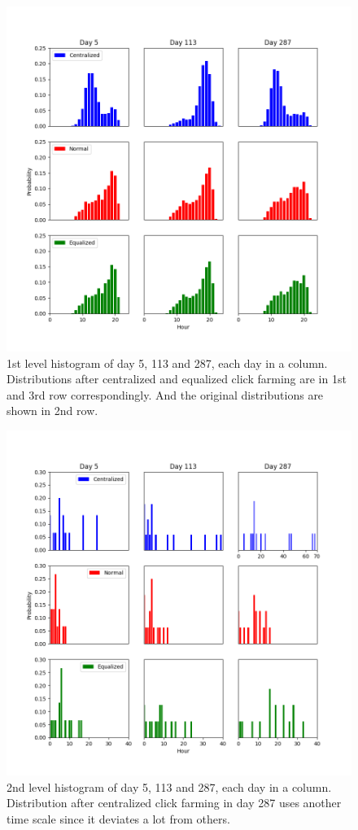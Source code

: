 \documentclass[a4paper]{IEEEtran}
\begin{document}
			\begin{figure}[!ht]
				\centering
				\includegraphics[width=\linewidth]{fig/Raw1stLevelHist.png}
				\caption{1st level histogram of day 5, 113 and 287, each day in a column. Distributions after centralized and equalized click farming are in 1st and 3rd row correspondingly. And the original distributions are shown in 2nd row.}
				\label{fig:raw-hist-1st}
			\end{figure}
			
			\begin{figure}[!ht]
				\centering
				\includegraphics[width=\linewidth]{fig/Raw2ndLevelHist}
				\caption{2nd level histogram of day 5, 113 and 287, each day in a column. Distribution after centralized click farming in day 287 uses another time scale since it deviates a lot from others.}
				\label{fig:raw-hist-2nd}
			\end{figure}
			
\end{document}
